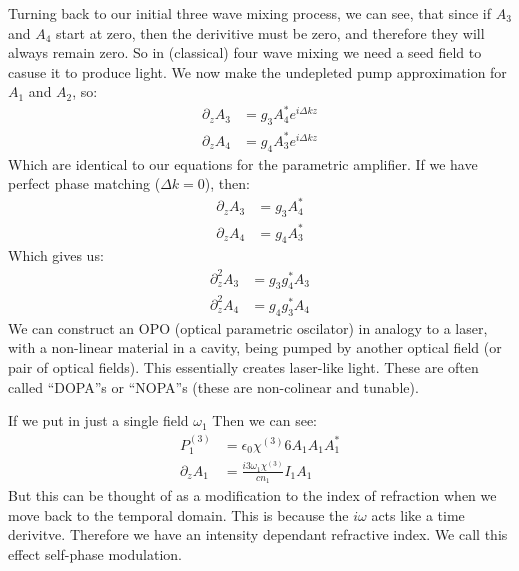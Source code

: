 Turning back to our initial three wave mixing process, we can see, that since if $A_3$ and $A_4$ start at zero, then the derivitive must be zero, and therefore they will always remain zero.
So in (classical) four wave mixing we need a seed field to casuse it to produce light. We now make the undepleted pump approximation for $A_1$ and $A_2$, so:
\begin{align*}
	\partial_z A_3 &= g_3 A_4^* e^{i\Delta kz} \\
	\partial_z A_4 &= g_4 A_3^* e^{i\Delta kz}
\end{align*}
Which are identical to our equations for the parametric amplifier. If we have perfect phase matching ($\Delta k =0$), then:
\begin{align*}
	\partial_z A_3 &= g_3 A_4^* \\
	\partial_z A_4 &= g_4 A_3^* 
\end{align*}
Which gives us:
\begin{align*}
	\partial_z^2 A_3 &= g_3g_4^* A_3 \\
	\partial_z^2 A_4 &= g_4g_3^* A_4
\end{align*}
We can construct an OPO (optical parametric oscilator) in analogy to a laser, with a non-linear material in a cavity, being pumped by another optical field (or pair of optical fields). This essentially creates laser-like light.
These are often called ``DOPA''s or ``NOPA''s (these are non-colinear and tunable).

If we put in just a single field $\omega_1$ Then we can see:
\begin{align*}
	P_1^{(3)} &= \epsilon_0 \chi^{(3)} 6A_1A_1A_1^* \\
	\partial_z A_1 &= \frac{i3\omega_1 \chi^{(3)}}{cn_1}I_1A_1
\end{align*}
But this can be thought of as a modification to the index of refraction when we move back to the temporal domain. This is because the $i\omega$ acts like a time derivitve. Therefore we have an intensity dependant refractive index.
We call this effect self-phase modulation.
